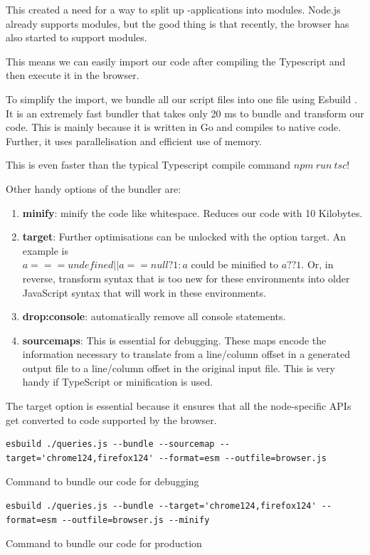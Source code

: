 This created a need for a way to split up -applications into modules. Node.js already supports modules, but the good thing is that recently, the browser has also started to support modules. \cite{noauthor_javascript_2024}

This means we can easily import our  code after compiling the Typescript and then execute it in the browser.

To simplify the import, we bundle all our script files into one file using Esbuild \cite{noauthor_esbuild_nodate}. It is an extremely fast bundler that takes only 20 ms to bundle and transform our code. This is mainly because it is written in Go and compiles to native code. Further, it uses parallelisation and efficient use of memory.

This is even faster than the typical Typescript compile command $npm\ run\ tsc$!

Other handy options of the bundler are:
\begin{enumerate}
    \item \textbf{minify}: minify the code like whitespace. Reduces our code with 10 Kilobytes.
    \item \textbf{target}: Further optimisations can be unlocked with the option target. An example is \\$a === undefined || a == null? 1 : a$ could be minified to $a ?? 1$. Or, in reverse, transform  syntax that is too new for these environments into older JavaScript syntax that will work in these environments.
    \item \textbf{drop:console}: automatically remove all console statements.
    \item \textbf{sourcemaps}: This is essential for debugging. These maps encode the information necessary to translate from a line/column offset in a generated output file to a line/column offset in the original input file. This is very handy if TypeScript or minification is used.
\end{enumerate}

The target option is essential because it ensures that all the node-specific APIs get converted to code supported by the browser.

\begin{listing}[H]
    \begin{verbatim}
esbuild ./queries.js --bundle --sourcemap --target='chrome124,firefox124' --format=esm --outfile=browser.js
    \end{verbatim}
    \caption{Command to bundle our  code for debugging}
\end{listing}
\begin{listing}[H]
    \begin{verbatim}
esbuild ./queries.js --bundle --target='chrome124,firefox124' --format=esm --outfile=browser.js --minify
    \end{verbatim}
    \caption{Command to bundle our  code for production}
\end{listing}

